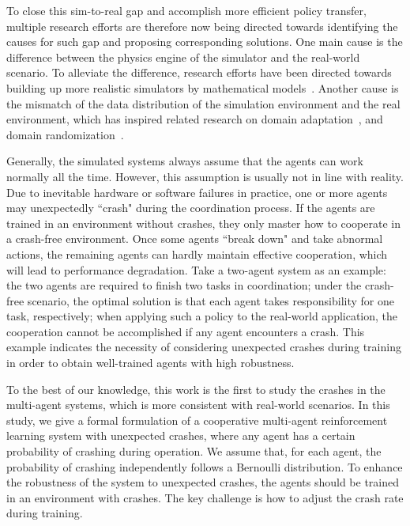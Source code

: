 \documentclass{article}
\begin{document}
To close this sim-to-real gap and accomplish more efficient policy transfer, multiple research efforts are therefore now being directed towards identifying the causes for such gap and proposing corresponding solutions.
One main cause is the difference between the physics engine of the simulator and the real-world scenario.
To alleviate the difference, research efforts have been directed towards building up more realistic simulators by mathematical models~\cite{shah2018airsim,dosovitskiy2017carla,furrer2016rotors,mccord2019distributed,todorov2012mujoco,wang2021pre}.
Another cause is the mismatch of the data distribution of the simulation environment and the real environment, which has inspired related research on domain adaptation~\cite{higgins2017darla,traore2019continual,arndt2020meta}, and domain randomization~\cite{tobin2017domain}.

Generally, the simulated systems always assume that the agents can work normally all the time.
However, this assumption is usually not in line with reality.
Due to inevitable hardware or software failures in practice, one or more agents may unexpectedly ``crash" during the coordination process.
If the agents are trained in an environment without crashes, they only master how to cooperate in a crash-free environment.
Once some agents ``break down" and take abnormal actions, the remaining agents can hardly maintain effective cooperation, which will lead to performance degradation.
Take a two-agent system as an example:
the two agents are required to finish two tasks in coordination;
under the crash-free scenario, the optimal solution is that each agent takes responsibility for one task, respectively;
when applying such a policy to the real-world application, the cooperation cannot be accomplished if any agent encounters a crash.
This example indicates the necessity of considering unexpected crashes during training in order to obtain well-trained agents with high robustness.

To the best of our knowledge, this work is the first to study the crashes in the multi-agent systems, which is more consistent with real-world scenarios.
In this study, we give a formal formulation of a cooperative multi-agent reinforcement learning system with unexpected crashes, where any agent has a certain probability of crashing during operation.
We assume that, for each agent, the probability of crashing independently follows a Bernoulli distribution.
To enhance the robustness of the system to unexpected crashes, the agents should be trained in an environment with crashes.
The key challenge is how to adjust the crash rate during training.
\end{document}
